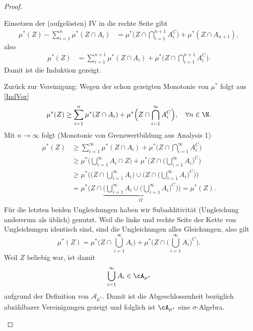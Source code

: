 \begin{proof}
\begin{enumerate}[label=(\alph*)]
\begin{itemize}
		Einsetzen der (aufgel\"osten) IV in die rechte Seite gibt
		\begin{align*}
			  \mu^{*}(Z) - \sum\limits_{i = 1}^{n} \mu^{*}(Z \cap A_i) & = \mu^{*}\Big(Z \cap \bigcap\limits_{i=1}^{n + 1} A_i^C \Big) + \mu^{*}(Z \cap A_{n+1}), 
		\end{align*}
		also 
		\begin{align*}
			\mu^{*}(Z) & = \sum\limits_{i = 1}^{n + 1} \mu^{*}(Z \cap A_i) + \mu^{*}\Big(Z \cap \bigcap\limits_{i=1}^{n + 1} A_i^C \Big).
		\end{align*}
		Damit ist die Induktion gezeigt.
	\end{itemize}
	Zur\"uck zur Vereinigung: Wegen der schon gezeigten Monotonie von $\mu^*$ folgt aus \eqref{IndVor}  \[ \mu^{*}(Z) \geq \sum\limits_{i=1}^{n} \mu^{*}(Z \cap A_i) + \mu^{*}\Big(Z \cap \bigcap\limits_{i = 1}^{\infty} A_i^C\Big), \quad \forall n \in \N. \]
		Mit $n \to \infty$ folgt (Monotonie von Grenzwertbildung aus Analysis 1)
		\begin{align}\label{ab}
		\begin{split}
			\mu^{*}(Z) &\geq \sum\limits_{i=1}^{\infty} \mu^{*}(Z \cap A_i) + \mu^{*}\Big(Z \cap \bigcap\limits_{i = 1}^{\infty} A_i^C\Big)\\ 
			&\geq \mu^{*} \Big(\bigcup\limits_{i = 1}^{\infty} A_i \cap Z \Big) + \mu^{*}\Big(Z \cap \Big(\bigcup\limits_{i = 1}^{\infty} A_i\Big)^C\Big)\\
			&\geq  \mu^{*}\Big(\Big(Z \cap \bigcup\limits_{i = 1}^{\infty} A_i\Big) \cup \Big(Z\cap \Big(\bigcup\limits_{i = 1}^{\infty} A_i\Big)^C\Big)\Big)\\
			& = \mu^{*}\Big(Z \cap \underbrace{\Big(\bigcup\limits_{i = 1}^{\infty} A_i \cup \Big(\bigcup\limits_{i = 1}^{\infty} A_i\Big)^C\Big)}_{\Omega}\Big) = \mu^{*}(Z).
		\end{split}
		\end{align}
		F\"ur die letzten beiden Ungleichungen haben wir Subadditivit\"at (Ungleichung andersrum als \"ublich) genutzt. 
	Weil die linke und rechte Seite der Kette von Ungleichungen identisch sind, sind die Ungleichungen alles Gleichungen, also gilt \[ \mu^{*}(Z) = \mu^{*}\Big(Z \cap \bigcup\limits_{i=1}^{\infty} A_i\Big) + \mu^{*}\Big(Z \cap \Big(\bigcup\limits_{i=1}^{\infty} A_i\Big)^C\Big).  \] Weil $Z$ beliebig war, ist damit \[ \bigcup\limits_{i=1}^{\infty} A_i \in \cA_{\mu^{*}} \] aufgrund der Definition von $\mathcal A_{\mu^*}$.	Damit ist die Abgeschlossenheit bez\"uglich abz\"ahlbarer Vereinigungen gezeigt und folglich ist $\cA_{\mu^{*}}$ eine $\sigma$-Algebra. 

\end{enumerate}
\end{proof}
